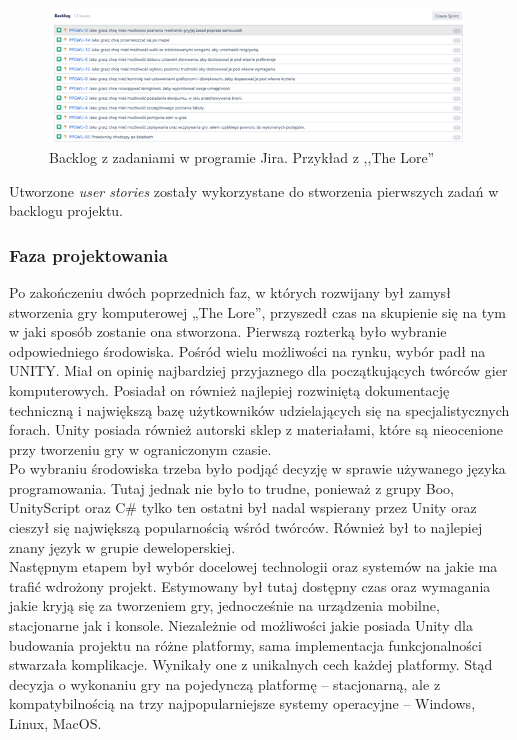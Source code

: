 \documentclass[oneside,polski,logo]{amuthesis}
\begin{document}
\begin{figure}[h]
	\centering
	\includegraphics[width=11cm]{images/hyps/backlog.png}
	\caption{Backlog z zadaniami w programie Jira. Przykład z ,,The Lore''}
\end{figure}

Utworzone \emph{user stories} zostały wykorzystane do stworzenia pierwszych zadań w backlogu projektu.\\ 

\subsubsection{Faza projektowania}

Po zakończeniu dwóch poprzednich faz, w których rozwijany był zamysł stworzenia gry komputerowej „The Lore”, przyszedł czas na skupienie się na tym w jaki sposób zostanie ona stworzona. Pierwszą rozterką było wybranie odpowiedniego środowiska. Pośród wielu możliwości na rynku, wybór padł na UNITY. Miał on opinię najbardziej przyjaznego dla początkujących twórców gier komputerowych. Posiadał on również najlepiej rozwiniętą dokumentację techniczną i największą bazę użytkowników udzielających się na specjalistycznych forach. Unity posiada również autorski sklep z materiałami, które są nieocenione przy tworzeniu gry w ograniczonym czasie.\\

Po wybraniu środowiska trzeba było podjąć decyzję w sprawie używanego języka programowania. Tutaj jednak nie było to trudne, ponieważ z grupy Boo, UnityScript oraz C\# tylko ten ostatni był nadal wspierany przez Unity oraz cieszył się największą popularnością wśród twórców. Również był to najlepiej znany język w grupie deweloperskiej.\\

Następnym etapem był wybór docelowej technologii oraz systemów na jakie ma trafić wdrożony projekt. Estymowany był tutaj dostępny czas oraz wymagania jakie kryją się za tworzeniem gry, jednocześnie na urządzenia mobilne, stacjonarne jak i konsole. Niezależnie od możliwości jakie posiada Unity dla budowania projektu na różne platformy, sama implementacja funkcjonalności stwarzała komplikacje. Wynikały one z unikalnych cech każdej platformy. Stąd decyzja o wykonaniu gry na pojedynczą platformę – stacjonarną, ale z kompatybilnością na trzy najpopularniejsze systemy operacyjne – Windows, Linux, MacOS.\\
\end{document}
